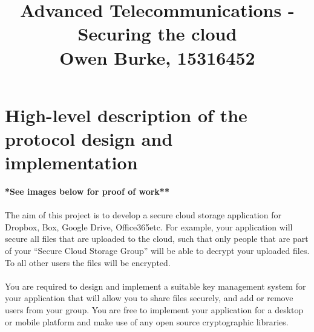 \documentclass{report}
\title{\textbf{Advanced Telecommunications - Securing the cloud}\\Owen Burke, 15316452}
\begin{document}

    \maketitle
    \section*{\hfil High-level description of the protocol design and implementation \hfil}
    \textbf{\large**See images below for proof of work**}\\\\
    The aim of this project is to develop a secure cloud storage application for Dropbox, Box, Google Drive, Office365etc. For example, your application will secure all files that are uploaded to the cloud, such that only people that are part of your “Secure Cloud Storage Group” will be able to decrypt your uploaded files. To all other users the files will be encrypted.\\\\
    You are required to design and implement a suitable key management system for your application that will allow you to share files securely, and add or remove users from your group. You are free to implement your application for a desktop or mobile platform and make use of any open source cryptographic libraries.\\\\
\end{document}
